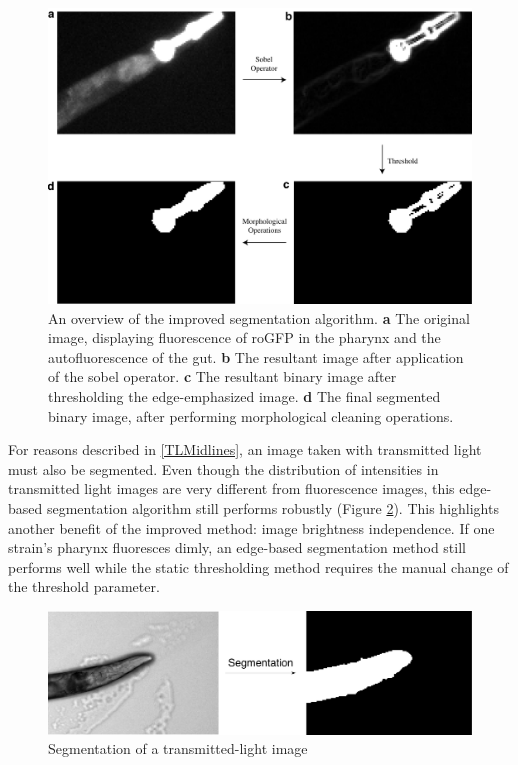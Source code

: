 \begin{figure}[ht]
    \centering
    \includegraphics[scale=.40]{Figures/rendered_files/sobel}
    \decoRule
    \caption[Overview of the improved segmentation algorithm]{An overview of the improved segmentation algorithm. \textbf{a} The original image, displaying fluorescence of roGFP in the pharynx and the autofluorescence of the gut. \textbf{b} The resultant image after application of the sobel operator. \textbf{c} The resultant binary image after thresholding the edge-emphasized image. \textbf{d} The final segmented binary image, after performing morphological cleaning operations.}
    \label{fig:NewPipeline}
\end{figure}

For reasons described in \ref{TLMidlines}, an image taken with transmitted light must also be segmented. Even though the distribution of intensities in transmitted light images are very different from fluorescence images, this edge-based segmentation algorithm still performs robustly (Figure \ref{fig:TLSeg}). This highlights another benefit of the improved method: image brightness independence. If one strain's pharynx fluoresces dimly, an edge-based segmentation method still performs well while the static thresholding method requires the manual change of the threshold parameter.

\begin{figure}[ht]
    \centering
    \includegraphics[scale=.30]{Figures/rendered_files/tl_segmentation}
    \decoRule
    \caption[Segmentation of a transmitted-light image]{Segmentation of a transmitted-light image}
    \label{fig:TLSeg}
\end{figure}

